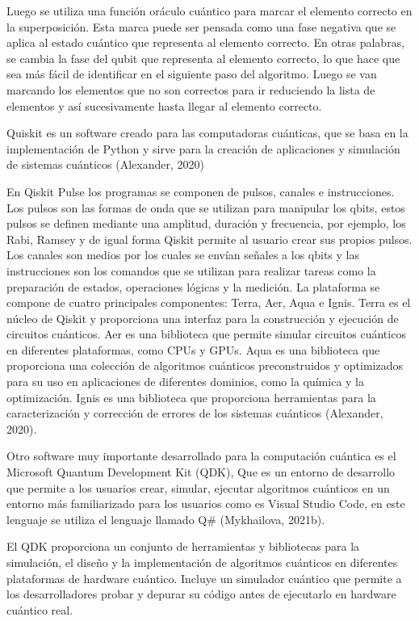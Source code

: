 \documentclass[twoside]{article}
\begin{document}
Luego se utiliza una función oráculo cuántico para marcar el elemento correcto en la superposición. Esta marca puede ser pensada como una fase negativa que se aplica al estado cuántico que representa al elemento correcto. En otras palabras, se cambia la fase del qubit que representa al elemento correcto, lo que hace que sea más fácil de identificar en el siguiente paso del algoritmo. Luego se van marcando los elementos que no son correctos para ir reduciendo la lista de elementos y así sucesivamente hasta llegar al elemento correcto. 

Quiskit es un software creado para las computadoras cuánticas, que se basa en la implementación de Python y sirve para la creación de aplicaciones y simulación de sistemas cuánticos (Alexander, 2020)

En Qiskit Pulse los programas se componen de pulsos, canales e instrucciones. Los pulsos son las formas de onda que se utilizan para manipular los qbits, estos pulsos se definen mediante una amplitud, duración y frecuencia, por ejemplo, los Rabi, Ramsey y de igual forma Qiskit permite al usuario crear sus propios pulsos. Los canales son medios por los cuales se envían señales a los qbits y las instrucciones son los comandos que se utilizan para realizar tareas como la preparación de estados, operaciones lógicas y la medición.
La plataforma se compone de cuatro principales componentes: Terra, Aer, Aqua e Ignis. Terra es el núcleo de Qiskit y proporciona una interfaz para la construcción y ejecución de circuitos cuánticos. Aer es una biblioteca que permite simular circuitos cuánticos en diferentes plataformas, como CPUs y GPUs. Aqua es una biblioteca que proporciona una colección de algoritmos cuánticos preconstruidos y optimizados para su uso en aplicaciones de diferentes dominios, como la química y la optimización. Ignis es una biblioteca que proporciona herramientas para la caracterización y corrección de errores de los sistemas cuánticos (Alexander, 2020). 

Otro software muy importante desarrollado para la computación cuántica es el Microsoft Quantum Development Kit (QDK), Que es un entorno de desarrollo que permite a los usuarios crear, simular, ejecutar algoritmos cuánticos en un entorno más familiarizado para los usuarios como es Visual Studio Code, en este lenguaje se utiliza el lenguaje llamado Q\# (Mykhailova, 2021b).

El QDK proporciona un conjunto de herramientas y bibliotecas para la simulación, el diseño y la implementación de algoritmos cuánticos en diferentes plataformas de hardware cuántico. Incluye un simulador cuántico que permite a los desarrolladores probar y depurar su código antes de ejecutarlo en hardware cuántico real. 
\end{document}

